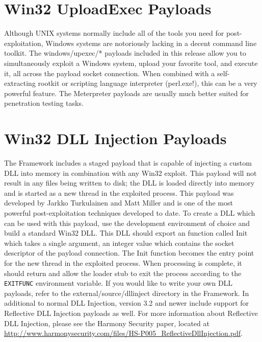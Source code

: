 \documentclass{report}
\begin{document}
\section{Win32 UploadExec Payloads}
\par
Although UNIX systems normally include all of the tools you need for
post-exploitation, Windows systems are notoriously lacking in a decent command
line toolkit. The windows/upexec/* payloads included in this release allow you to
simultaneously exploit a Windows system, upload your favorite tool, and execute
it, all across the payload socket connection. When combined with a
self-extracting rootkit or scripting language interpreter (perl.exe!), this can
be a very powerful feature. The Meterpreter payloads are usually much better
suited for penetration testing tasks.

\section{Win32 DLL Injection Payloads}
\par
The Framework includes a staged payload that is
capable of injecting a custom DLL into memory in combination with any Win32
exploit. This payload will not result in any files being written to disk; the
DLL is loaded directly into memory and is started as a new thread in the
exploited process. This payload was developed by Jarkko Turkulainen and Matt
Miller and is one of the most powerful post-exploitation techniques developed
to date. To create a DLL which can be used with this payload, use the
development environment of choice and build a standard Win32 DLL. This DLL
should export an function called Init which takes a single argument, an
integer value which contains the socket descriptor of the payload connection.
The Init function becomes the entry point for the new thread in the exploited
process. When processing is complete, it should return and allow the loader
stub to exit the process according to the \texttt{EXITFUNC} environment
variable. If you would like to write your own DLL payloads, refer to the
external/source/dllinject directory in the Framework. In additional to normal
DLL Injection, version 3.2 and newer include support for Reflective DLL Injection
payloads as well. For more information about Reflective DLL Injection, please see
the Harmony Security paper, located at
\url{http://www.harmonysecurity.com/files/HS-P005_ReflectiveDllInjection.pdf}.
\end{document}
